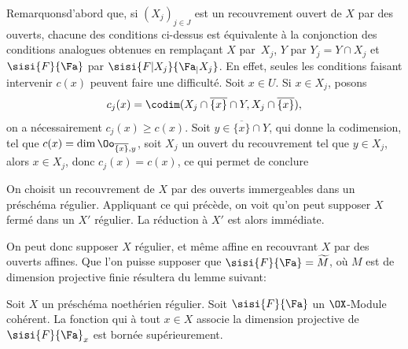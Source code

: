 Remarquons\pageoriginaled d'abord que, si $(X_j)_{j\in
J}$ est un recouvrement ouvert de $X$ par des ouverts, chacune des conditions
ci-dessus est \'equivalente \`a la conjonction des conditions
analogues obtenues en rempla\c cant $X$ par~$X_j$, $Y$ par
$Y_j=Y\cap X_j$ et $\sisi{F}{{\Fa}}$ par
$\sisi{F{|X_j}}{{\Fa}_|X_j}$. En effet, seules les conditions
faisant intervenir $c(x)$ peuvent faire une difficult\'e. Soit $x\in
U$. Si $x\in X_j$, posons
\[
c_j(x)=\codim(X_j\cap \overline{\{x\}}\cap Y, X_j\cap\overline{\{x\}}),
\]
on a n\'ecessairement $c_j(x)\geq c(x)$. Soit $y\in
\overline{\{x\}}\cap Y$, qui \og donne la codimension\fg, \ie tel
que $c(x)=\dim \Oo_{\overline{\{x\}}, y}$, soit $X_j$ un ouvert du
recouvrement tel que $y\in X_j$, alors $x\in X_j$, donc
$c_j(x)=c(x)$, ce qui permet de conclure

On choisit un recouvrement de $X$ par des ouverts immergeables dans un pr\'esch\'ema r\'egulier. Appliquant ce qui pr\'ec\`ede, on voit qu'on peut supposer $X$ ferm\'e dans un $X'$ r\'egulier. La r\'eduction \`a $X'$ est alors imm\'ediate.

On peut donc supposer $X$ r\'egulier, et m\^eme affine en recouvrant $X$ par des ouverts affines. Que l'on puisse supposer que $\sisi{F}{{\Fa}}=\widetilde{M}$, o\`u $M$ est de dimension projective finie r\'esultera du lemme suivant:

\begin{lemme} \label{VIII.2.4}
Soit $X$ un pr\'esch\'ema noeth\'erien r\'egulier. Soit $\sisi{F}{{\Fa}}$ un $\OX$-Module coh\'erent. La fonction qui \`a tout $x\in X$ associe la dimension projective de $\sisi{F}{{\Fa}}_x$ est born\'ee sup\'erieurement.
\end{lemme}

